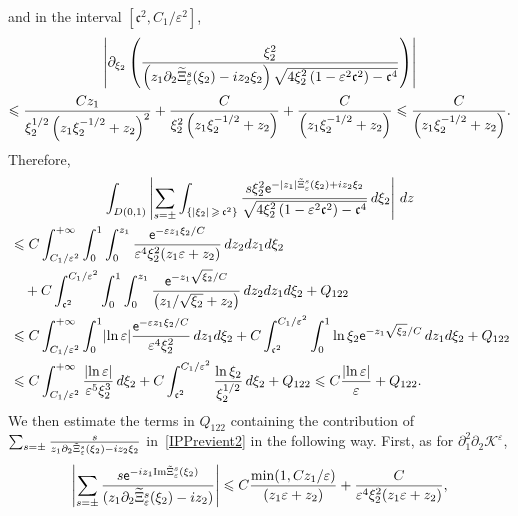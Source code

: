 \documentclass[AHL,Unicode,longabstracts,published]{cedram}
\newcommand*\p{\partial}
\newcommand{\Imm}{\mathrm{Im}}
\newcommand*\BK{\mathcal{K}}
\newcommand*\ex{{\sf e}}
\newcommand*\cs{{\mathfrak c}}
\newcommand*\ii{\infty}
\newcommand*\gs{\geqslant }
\newcommand*\ls{\leqslant }
\newcommand*\e{\varepsilon}
\renewcommand*\t{\tilde}
\let\oldtilde\tilde
\renewcommand*{\tilde}[1]{\mathchoice{\widetilde{#1}}{\widetilde{#1}}{\oldtilde{#1}}{\oldtilde{#1}}}
\begin{document}
and in the interval $ [\cs^2, C_1 / \e^{2}] $,
\begin{multline}\label{IPPrevient2}
 \left\lvert \p_{\xi_2} \left(\frac{ \xi_2^2 }{ \left(z_1 \p_2 \t\Xi_\e^s (\xi_2) - i z_2 \xi_2\right) \sqrt{ 4 \xi_2^2\left(1 - \e^2 \cs^2\right) - \cs^4}}
\right)\right\rvert
\\ 
\ls \frac{ C z_1 }{ \xi_2^{1/2}\left(z_1 \xi_2^{-1/2} + z_2\right)^2 } + \frac{ C }{ \xi_2^{2}\left(z_1 \xi_2^{-1/2} + z_2\right)} + \frac{ C }{\left(z_1 \xi_2^{-1/2} + z_2\right)}
\ls
\frac{ C }{\left(z_1 \xi_2^{-1/2} + z_2\right)}.
\end{multline}
Therefore,
\begin{multline*}
\int_{D(0,1)}  \left\lvert \sum_{s =\pm } \int_{\left\{ |\xi_2 |\,\gs\,\cs^{2}\right\}} \frac{ s \xi_2^2 \ex^{- |z_1| \t\Xi_\e^s (\xi_2) + i z_2 \xi_2} }{
\sqrt{ 4 \xi_2^2 \left(1 - \e^2 \cs^2\right) - \cs^4 } } \, d\xi_2 \right\rvert \, dz
\\
\begin{aligned}
 & \ls C \int_{C_1/ \e^{2} }^{+\ii} \int_0^1 \int_0^{z_1}
\frac{ \ex^{- \e z_1 \xi_2/C} }{ \e^4 \xi_2^2 (z_1 \e + z_2) } \, dz_2 dz_1 d\xi_2
\\ & \quad + C \int_{\cs^2}^{ C_1 / \e^{2} } \int_0^1 \int_0^{z_1}
\frac{ \ex^{- z_1 \sqrt{\xi_2} / C} }{\left(z_1 / \sqrt{\xi_2} + z_2\right) } \, dz_2 dz_1 d\xi_2 + Q_{122}
\\ &
\ls C \int_{ C_1 / \e^{2} }^{+\ii} \int_0^1
\lvert \ln \e \rvert \frac{ \ex^{- \e z_1 \xi_2 /C } }{ \e^4 \xi_2^2 }\, dz_1 d \xi_2 + C \int_{\cs^2}^{ C_1 /\e^{2} } \int_0^1 \ln \xi_2 \ex^{- z_1 \sqrt{\xi_2} /C} \, dz_1 d\xi_2 + Q_{122}
\\ &
\ls C \int_{ C_1 / \e^{2} }^{+\ii}
\frac{ \lvert \ln \e \rvert}{\e^5 \xi_2^3 } \, d \xi_2 + C \int_{\cs^2}^{ C_1 /\e^{2} } \frac{ \ln \xi_2 }{ \xi_2^{1/2} } \, d\xi_2 + Q_{122}
\ls C \frac{ \lvert \ln \e \rvert }{ \e } + Q_{122}.
\end{aligned}
\end{multline*}
We then estimate the terms in $ Q_{122} $ containing the contribution of $ \sum_{s=\pm} \frac{s}{z_1 \p_2 \t\Xi_\e^s (\xi_2) - i z_2 \xi_2} $ in~\eqref{IPPrevient2} in the following way. First, as for $ \p_1^2 \p_2 \BK^\e $,
\begin{align*}
\left\lvert \sum_{s = \pm} \frac{s \ex^{- i z_1 {\Imm} \t\Xi_\e^s (\xi_2) } }{ (z_1 \p_2 \t\Xi_\e^s (\xi_2) - i z_2) } \right\rvert
\ls C \frac{ \min (1, Cz_1 / \e) }{(z_1 \e + z_2)} + \frac{C }{ \e^4 \xi_2^2 (z_1 \e + z_2) },
\end{align*}
\end{document}
